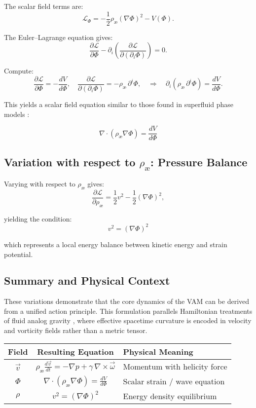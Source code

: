 The scalar field terms are:
\[
    \mathcal{L}_\Phi = - \frac{1}{2} \rho_\text{\ae} (\nabla \Phi)^2 - V(\Phi).
\]

The Euler--Lagrange equation gives:
\[
    \frac{\partial \mathcal{L}}{\partial \Phi} - \partial_i \left( \frac{\partial \mathcal{L}}{\partial (\partial_i \Phi)} \right) = 0.
\]

Compute:
\[
    \frac{\partial \mathcal{L}}{\partial \Phi} = -\frac{dV}{d\Phi}, \quad
    \frac{\partial \mathcal{L}}{\partial (\partial_i \Phi)} = - \rho_\text{\ae}\, \partial^i \Phi,
    \quad \Rightarrow \quad
    \partial_i ( \rho_\text{\ae}\, \partial^i \Phi ) = \frac{dV}{d\Phi}.
\]

This yields a scalar field equation similar to those found in superfluid phase models \cite{khalatnikov2000}:

\begin{equation}
    \boxed{
        \nabla \cdot (\rho_\text{\ae} \nabla \Phi) = \frac{dV}{d\Phi}
    }
\end{equation}

\subsection*{Variation with respect to $\rho_\text{\ae}$: Pressure Balance}

Varying with respect to \( \rho_\text{\ae} \) gives:
\[
    \frac{\partial \mathcal{L}}{\partial \rho_\text{\ae}} = \frac{1}{2} v^2 - \frac{1}{2} (\nabla \Phi)^2,
\]

yielding the condition:
\begin{equation}
    \boxed{
        v^2 = (\nabla \Phi)^2
    }
\end{equation}

which represents a local energy balance between kinetic energy and strain potential.

\subsection*{Summary and Physical Context}

These variations demonstrate that the core dynamics of the VAM can be derived from a unified action principle. This formulation parallels Hamiltonian treatments of fluid analog gravity \cite{barcelo2011}, where effective spacetime curvature is encoded in velocity and vorticity fields rather than a metric tensor.

\begin{center}
    \begin{tabular}{|c|c|l|}
        \hline
        Field & Resulting Equation & Physical Meaning \\
        \hline
        $\vec{v}$ & $\rho_\text{\ae} \frac{d \vec{v}}{dt} = -\nabla p + \gamma\, \nabla \times \vec{\omega}$ & Momentum with helicity force \\
        $\Phi$ & $\nabla \cdot (\rho_\text{\ae}\nabla \Phi) = \frac{dV}{d\Phi}$ & Scalar strain / wave equation \\
        $\rho$ & $v^2 = (\nabla \Phi)^2$ & Energy density equilibrium \\
        \hline
    \end{tabular}
\end{center}
